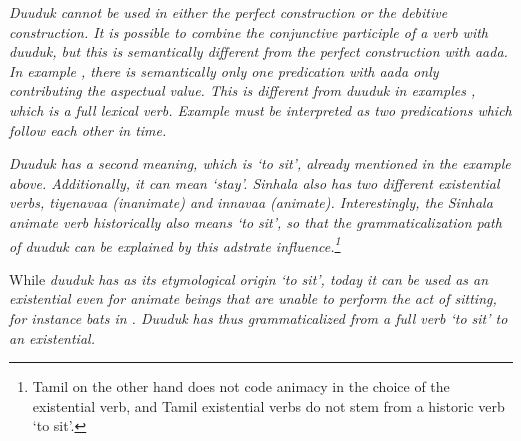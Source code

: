 
\em Duuduk \em cannot be used in either the perfect construction or the debitive construction. It is possible to combine the conjunctive participle of a verb with \em duuduk\em, but this is semantically different from the perfect construction with \em aada\em. In example , there is semantically only one predication with \em aada \em only contributing the aspectual value. This is different from \em duuduk \em in  examples , which is a full lexical verb. Example  must be interpreted as two predications which follow each other in time.




 \em Duuduk \em has a second meaning, which is `to sit', already mentioned in the example above.
Additionally, it can  mean `stay'. Sinhala also has two different existential verbs, \em tiyenavaa \em (inanimate) and \em innavaa \em (animate). Interestingly, the Sinhala animate verb historically also means `to sit', so that the grammaticalization path of \em duuduk \em can be explained by this adstrate influence.\footnote{Tamil on the other hand does not code animacy in the choice of the existential verb, and Tamil existential verbs do not stem from a historic verb `to sit'.}

While \em duuduk \em has as its etymological origin `to sit', today it can be used as an existential even for animate beings that are unable to perform the act of sitting, for instance bats in . \em Duuduk \em has thus grammaticalized from a full verb `to sit' to an existential.


